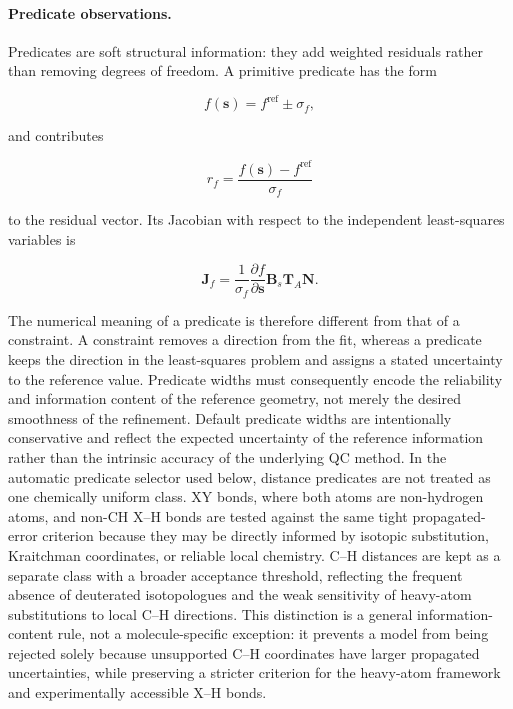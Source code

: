 \documentclass[aip,jcp,reprint,longbibliography,floatfix]{revtex4-2}
\begin{document}
\paragraph{Predicate observations.}

Predicates are soft structural information: they add weighted residuals rather
than removing degrees of freedom.\cite{Bartell1975Predicate} A primitive
predicate has the form

\begin{equation}
f(\mathbf{s})
=
f^{\mathrm{ref}}
\pm
\sigma_f ,
\end{equation}

and contributes

\begin{equation}
r_f
=
\frac{f(\mathbf{s})-f^{\mathrm{ref}}}{\sigma_f}
\end{equation}

to the residual vector. Its Jacobian with respect to the independent
least-squares variables is

\begin{equation}
\mathbf{J}_f
=
\frac{1}{\sigma_f}
\frac{\partial f}{\partial\mathbf{s}}
\mathbf{B}_s
\mathbf{T}_{A}
\mathbf{N}.
\end{equation}

The numerical meaning of a predicate is therefore different from that of a
constraint. A constraint removes a direction from the fit, whereas a predicate
keeps the direction in the least-squares problem and assigns a stated
uncertainty to the reference value. Predicate widths must consequently encode
the reliability and information content of the reference geometry, not merely
the desired smoothness of the refinement. Default predicate widths are
intentionally conservative and reflect the expected uncertainty of the
reference information rather than the intrinsic accuracy of the underlying QC
method. In the automatic predicate selector
used below, distance predicates are not treated as one chemically uniform
class. XY bonds, where both atoms are non-hydrogen atoms, and non-CH X--H bonds
are tested against the same tight propagated-error criterion because they may
be directly informed by isotopic substitution, Kraitchman coordinates, or
reliable local chemistry. C--H distances are kept as a separate class with a
broader acceptance threshold, reflecting the frequent absence of deuterated
isotopologues and the weak sensitivity of heavy-atom substitutions to local
C--H directions. This distinction is a general information-content rule, not a
molecule-specific exception: it prevents a model from being rejected solely
because unsupported C--H coordinates have larger propagated uncertainties,
while preserving a stricter criterion for the heavy-atom framework and
experimentally accessible X--H bonds.
\end{document}
